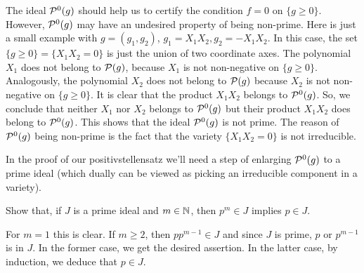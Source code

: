 The ideal $\mathcal{P}^0(g)$ should help us to certify the condition $f=0$ on $\{g \ge 0\}$. However, $\mathcal{P}^0(g)$ may have an undesired property of being non-prime. Here is just a small example with $g=(g_1,g_2)$, $g_1=X_1 X_2, g_2 = -X_1 X_2$. In this case, the set $\{g \ge 0\} = \{X_1 X_2 = 0\}$ is just the union of two coordinate axes. The polynomial $X_1$ does not belong to $\mathcal{P}(g)$, because $X_1$ is not non-negative on $\{g \ge 0\}$. Analogously, the polynomial $X_2$ does not belong to $\mathcal{P}(g)$ because $X_2$ is not non-negative on $\{g \ge 0\}$. It is clear that the product $X_1 X_2$ belongs to $\mathcal{P}^0(g)$. So, we conclude that neither $X_1$ nor $X_2$ belongs to $\mathcal{P}^0(g)$ but their product $X_1 X_2$ does belong to $\mathcal{P}^0(g)$. This shows that the ideal $\mathcal{P}^0(g)$ is not prime. The reason of $\mathcal{P}^0(g)$ being non-prime is the fact that the variety $\{X_1 X_2 = 0\}$ is not irreducible. 

In the proof of our positivstellensatz  we'll need a step of enlarging $\mathcal{P}^0(g)$ to a prime ideal (which dually can be viewed as picking an irreducible component in a variety). 


\begin{exercise}
	\label{powers:prime:ideals}
	Show that, if $J$ is a prime ideal  and $m \in \mathbb{N}$, then $p^m \in J$ implies $p \in J$.
\end{exercise}
\begin{solution}
	For $m=1$ this is clear. If $m \ge 2$, then $p p^{m-1} \in J$ and since $J$ is prime, $p$ or $p^{m-1}$ is in $J$. In the former case, we get the desired assertion. In the latter case, by induction, we deduce that $p \in J$.
\end{solution}


